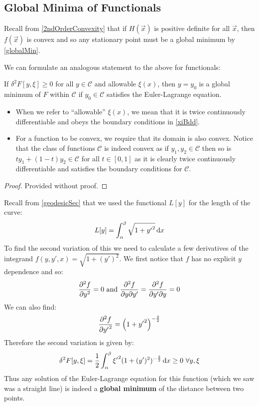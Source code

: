 \documentclass[../main.tex]{subfiles}
\begin{document}
\subsection{Global Minima of Functionals}
\begin{remark}[Recap]
  Recall from \cref{2ndOrderConvexity} that if $H(\vec{x})$ is positive definite for all $\vec{x}$, then $f(\vec{x})$ is convex and so any stationary point must be a global minimum by \cref{globalMin}.
\end{remark}
We can formulate an analogous statement to the above for functionals:
\begin{theorem}
  If $\delta^2 F[y, \xi] \geq 0$ for all $y \in \mathscr{C}$ and allowable $\xi(x)$, then $y = y_0$ is a global minimum of $F$ within $\mathscr{C}$ if $y_0 \in \mathscr{C}$ satisfies the Euler-Lagrange equation. \label{globalMinFunct}
\end{theorem}
\begin{remark}[Notes]
  \begin{itemize}
    \item When we refer to ``allowable'' $\xi(x)$, we mean that it is twice continuously differentiable and obeys the boundary conditions in \cref{xiBdd}.
    \item For a function to be convex, we require that its domain is also convex.
      Notice that the class of functions $\mathscr{C}$ is indeed convex as if $y_1, y_2 \in \mathscr{C}$ then so is $ty_1 + (1 - t)y_2 \in \mathscr{C}$ for all $t \in [0, 1]$ as it is clearly twice continuously differentiable and satisfies the boundary conditions for $\mathscr{C}$.
  \end{itemize}
\end{remark}
\begin{proof}
  Provided without proof.
\end{proof}
\begin{example}
  Recall from \cref{geodesicSec} that we used the functional $L[y]$ for the length of the curve:
  \[
    L[y] = \int_{\alpha}^{\beta} \sqrt{1 + {y'}^2} \d{x}
  \]
  To find the second variation of this we need to calculate a few derivatives of the integrand $f(y, y', x) = \sqrt{1 + (y')^2}$.
  We first notice that $f$ has no explicit $y$ dependence and so:
  \[
    \pderiv[2]{f}{y} = 0 \text{ and }  \frac{\partial^2 f}{\partial y \partial y'} = \frac{\partial^2 f}{\partial y' \partial y} = 0
  \]
  We can also find:
  \[
    \pderiv[2]{f}{{y'}} = \left(1 + {y'}^2\right)^{-\frac{3}{2}}
  \]
  Therefore the second variation is given by:
  \[
    \delta^2 F[y, \xi] = \frac{1}{2} \int_{\alpha}^{\beta} {\xi'}^2 (1 + (y')^2)^{-\frac{3}{2}} \d{x} \geq 0\ \forall y, \xi
  \]
  Thus any solution of the Euler-Lagrange equation for this function (which we saw was a straight line) is indeed a \textbf{global minimum} of the distance between two points.
\end{example}
\end{document}
